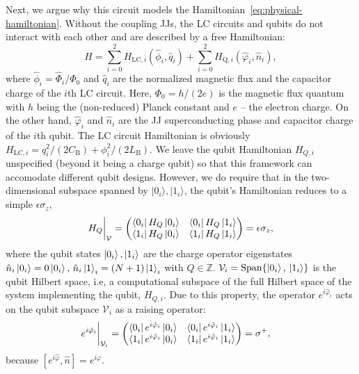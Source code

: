 \documentclass[reprint, aps, prx, amsmath, amssymb, longbibliography, superscriptaddress]{revtex4-2}
\begin{document}
Next, we argue why this circuit models the Hamiltonian~\eqref{eq:physical-hamiltonian}. Without the coupling JJs, the LC circuits and qubits do not interact with each other and are described by a free Hamiltonian:
\begin{equation}
    H = \sum_{i = 0}^2  H_{\text{LC}, i}(\hat \phi_i, \hat q_i) + \sum_{i = 0}^2 H_{\text{Q},i}(\hat \varphi_i, \hat n_i),
\end{equation}
where $ \hat\phi_i = \hat \Phi_i/\Phi_0$ and $\hat q_i$ are the normalized magnetic flux and  the capacitor charge of the $i$th LC circuit. Here, $\Phi_0 = h/(2e)$ is the magnetic flux quantum with $h$ being the (non-reduced) Planck constant and $e$ -- the electron charge. On the other hand,  $\hat \varphi_i$ and $ \hat n_i$ are the JJ superconducting phase and capacitor charge of the $i$th qubit. The LC circuit Hamiltonian is obviously $ H_{\text{LC}, i} = q_i^2/(2C_{\text{B}}) + \phi_i^2/(2L_{\text{B}})$. We leave the qubit Hamiltonian $H_{Q,i} $ unspecified (beyond it being a charge qubit) so that this framework can accomodate different qubit designs. However, we do require that in the two-dimensional subspace spanned by $|0_i\rangle, |1_i\rangle$, the qubit’s Hamiltonian reduces to a simple $\epsilon\sigma_z$,
\begin{align}
   H_{Q}\bigg|_{\mathcal{V}} = \begin{pmatrix} \bra{0_i} H_Q\ket{0_i} & \bra{0_i} H_Q \ket{1_i} \\ \bra{1_i} H_Q \ket{0_i} & \bra{1_i} H_Q \ket{1_i} \end{pmatrix} = \epsilon \sigma_z,
\end{align}
where the qubit states $\ket{0_i},\ket{1_i}$ are the charge operator eigenstates $ \hat n_i \ket{0_i} = 0 \ket{0_i}, \, \hat n_{i} \ket{1}_i = (N+1)\ket{1}_i$ with $ Q \in \mathbb{Z}$. $\mathcal{V}_i = \operatorname{Span}\{\ket{0_i},\, \ket{1_i}\}$ is the qubit Hilbert space, i.e, a computational subspace of the full Hilbert space of the system implementing the qubit, $H_{Q,i}$.  Due to this property, the operator $ e^{i\hat \varphi_i} $ acts on the qubit subspace $\mathcal{V}_i$ as a raising operator:
\begin{equation}
  \begin{aligned}
    &e^{i\hat\varphi_i}\bigg|_{\mathcal{V}_i} = \begin{pmatrix} \bra{0_i} e^{i\hat\varphi_i} \ket{0_i} & \bra{0_i} e^{i\hat\varphi_i} \ket{1_i} \\ \bra{1_i} e^{i\hat\varphi_i} \ket{0_i} & \bra{1_i} e^{i\hat\varphi_i} \ket{1_i} \end{pmatrix} = \sigma^+,
  \end{aligned}
\end{equation}
because $[e^{i\hat \varphi}, \hat n] = e^{i\hat \varphi}$. 
\end{document}
